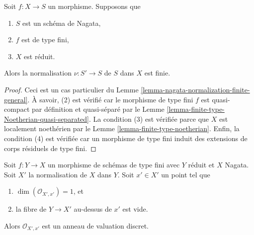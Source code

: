 \begin{lemma}
\label{lemma-nagata-normalization-finite}
Soit $f : X \to S$ un morphisme. Supposons que
\begin{enumerate}
\item $S$ est un schéma de Nagata,
\item $f$ est de type fini,
\item $X$ est réduit.
\end{enumerate}
Alors la normalisation $\nu : S' \to S$ de $S$ dans $X$ est finie.
\end{lemma}

\begin{proof}
Ceci est un cas particulier
du Lemme \ref{lemma-nagata-normalization-finite-general}. À savoir, (2) est vérifié
car le morphisme de type fini $f$ est quasi-compact par
définition et quasi-séparé par
le Lemme \ref{lemma-finite-type-Noetherian-quasi-separated}. La condition (3) est vérifiée parce
que $X$ est localement noethérien par le
Lemme \ref{lemma-finite-type-noetherian}. Enfin, la condition (4) est vérifiée car
un morphisme de type fini induit des extensions de corps résiduels
de type fini.
\end{proof}

\begin{lemma}
\label{lemma-relative-normalization-normal-codim-1}
Soit $f : Y \to X$ un morphisme de schémas de type fini avec $Y$ réduit et $X$
Nagata. Soit $X'$ la normalisation de $X$ dans $Y$.
Soit $x' \in X'$ un point tel que
\begin{enumerate}
\item $\dim(\mathcal{O}_{X', x'}) = 1$, et
\item la fibre de $Y \to X'$ au-dessus de $x'$ est vide.
\end{enumerate}
Alors $\mathcal{O}_{X', x'}$ est un anneau de valuation discret.
\end{lemma}

